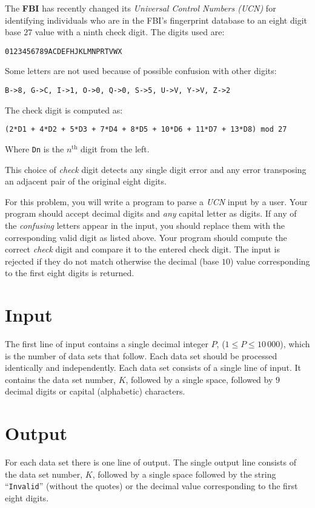 
The \textbf{FBI} has recently changed its \emph{Universal Control Numbers (UCN)} for identifying individuals who
are in the FBI's fingerprint database to an eight digit base $27$ value with a ninth check digit. The digits
used are:

\begin{center}
\begin{verbatim}
0123456789ACDEFHJKLMNPRTVWX
\end{verbatim}
\end{center}

Some letters are not used because of possible confusion with other digits:

\begin{center}
\begin{verbatim}
B->8, G->C, I->1, O->0, Q->0, S->5, U->V, Y->V, Z->2
\end{verbatim}
\end{center}

The check digit is computed as:

\begin{center}
\begin{verbatim}
(2*D1 + 4*D2 + 5*D3 + 7*D4 + 8*D5 + 10*D6 + 11*D7 + 13*D8) mod 27
\end{verbatim}
\end{center}

Where \texttt{Dn} is the $n^{\text{th}}$ digit from the left.

This choice of \emph{check} digit detects any single digit error and
any error transposing an adjacent pair of the original eight digits.

For this problem, you will write a program to parse a \emph{UCN} input by a user. Your program should
accept decimal digits and \emph{any} capital letter as digits. If any of the \emph{confusing} letters appear in the
input, you should replace them with the corresponding valid digit as listed above. Your program
should compute the correct \emph{check} digit and compare it to the entered check digit. The input is
rejected if they do not match otherwise the decimal (base $10$) value corresponding to the first eight
digits is returned.

\section*{Input}

The first line of input contains a single decimal integer $P$, ($1 \le P \le 10\,000$), which is the number of
data sets that follow. Each data set should be processed identically and independently.
Each data set consists of a single line of input. It contains the data set number, $K$, followed by a
single space, followed by $9$ decimal digits or capital (alphabetic) characters.

\section*{Output}

For each data set there is one line of output. The single output line consists of the data set number,
$K$, followed by a single space followed by the string ``\texttt{Invalid}'' (without the quotes) or the 
decimal value corresponding to the first eight digits.

